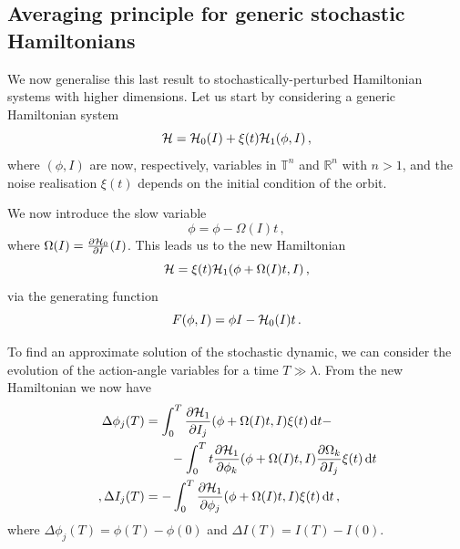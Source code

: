 \subsection{Averaging principle for generic stochastic Hamiltonians}

We now generalise this last result to stochastically-perturbed Hamiltonian systems with higher dimensions. Let us start by considering a generic Hamiltonian system
\begin{equation}
	\mathcal{H} = \mathcal{H}_0(I) + \xi(t)\mathcal{H}_1(\phi, I)\,,
\end{equation}
where \((\phi, I)\) are now, respectively, variables in $\mathbb{T}^n$ and $\mathbb{R}^n$ with $n>1$, and the noise realisation \(\xi(t)\) depends on the initial condition of the orbit.

We now introduce the slow variable
\begin{equation}
	\phi = \phi - \Omega(I)t\,,
\end{equation}
where \(\Omega(I) = \frac{\partial \mathcal{H}_0}{\partial I}(I)\). This leads us to the new Hamiltonian
\begin{equation}
	\mathcal{H} = \xi(t)\mathcal{H}_1(\phi+\Omega(I)t,I)\,,
\end{equation}
via the generating function
\begin{equation}
	F(\phi,I) = \phi I - \mathcal{H}_0(I)t\,.
\end{equation}

To find an approximate solution of the stochastic dynamic, we can consider the evolution of the action-angle variables for a time \(T\gg \lambda\). From the new Hamiltonian we now have
\begin{equation}
	\begin{aligned}
		\Delta\phi_j(T) &= \int_0^T\pdv{\mathcal{H}_1}{I_j}\/(\phi+\Omega(I)t, I)\xi(t)\,\mathrm{d}t -\\
		&\qquad - \int_0^T t\pdv{\mathcal{H}_1}{\phi_k}\/(\phi + \Omega(I)t,I)\pdv{\Omega_k}{I_j}\xi(t)\,\mathrm{d}t\\ \,,
		\Delta I_j(T) &= -\int_0^T\pdv{\mathcal{H}_1}{\phi_j}\/(\phi+\Omega(I)t,I)\xi(t)\,\mathrm{d}t\,,
	\end{aligned}
	\label{eq:averaging-generic-hams}
\end{equation}
where \(\Delta \phi_j(T)=\phi(T)-\phi(0)\) and \(\Delta I(T)=I(T)-I(0)\).

